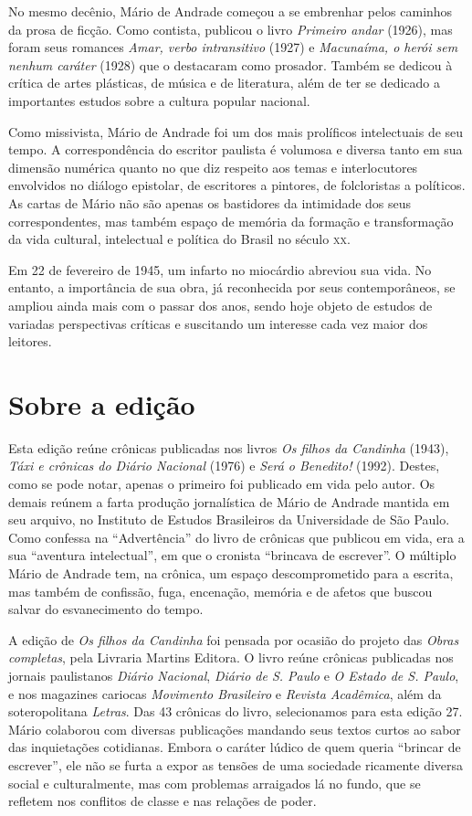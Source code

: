 No mesmo decênio, Mário de Andrade começou a se embrenhar pelos caminhos
da prosa de ficção. Como contista, publicou o livro \emph{Primeiro
andar} (1926), mas foram seus romances \emph{Amar, verbo intransitivo}
(1927) e \emph{Macunaíma, o herói sem nenhum caráter} (1928) que o
destacaram como prosador. Também se dedicou à crítica de artes
plásticas, de música e de literatura, além de ter se dedicado a
importantes estudos sobre a cultura popular nacional.

Como missivista, Mário de Andrade foi um dos mais prolíficos
intelectuais de seu tempo. A correspondência do escritor paulista é
volumosa e diversa tanto em sua dimensão numérica quanto no que diz
respeito aos temas e interlocutores envolvidos no diálogo epistolar, de
escritores a pintores, de folcloristas a políticos. As cartas de Mário
não são apenas os bastidores da intimidade dos seus correspondentes, mas
também espaço de memória da formação e transformação da vida cultural,
intelectual e política do Brasil no século \textsc{xx}.

Em 22 de fevereiro de 1945, um infarto no miocárdio abreviou sua vida.
No entanto, a importância de sua obra, já reconhecida por seus
contemporâneos, se ampliou ainda mais com o passar dos anos, sendo hoje
objeto de estudos de variadas perspectivas críticas e suscitando um
interesse cada vez maior dos leitores.

\section{Sobre a edição}

Esta edição reúne crônicas publicadas nos livros \emph{Os filhos da
Candinha} (1943), \emph{Táxi e crônicas do Diário Nacional} (1976) e
\emph{Será o Benedito!} (1992). Destes, como se pode notar, apenas o
primeiro foi publicado em vida pelo autor. Os demais reúnem a farta
produção jornalística de Mário de Andrade mantida em seu arquivo, no
Instituto de Estudos Brasileiros da Universidade de São Paulo. Como
confessa na ``Advertência'' do livro de crônicas que publicou em vida,
era a sua ``aventura intelectual'', em que o cronista ``brincava de
escrever''. O múltiplo Mário de Andrade tem, na crônica, um espaço
descomprometido para a escrita, mas também de confissão, fuga,
encenação, memória e de afetos que buscou salvar do esvanecimento do
tempo.

A edição de \emph{Os filhos da Candinha} foi pensada por ocasião do
projeto das \emph{Obras completas}, pela Livraria Martins Editora. O
livro reúne crônicas publicadas nos jornais paulistanos \emph{Diário
Nacional}, \emph{Diário de S. Paulo} e \emph{O Estado de S. Paulo}, e
nos magazines cariocas \emph{Movimento Brasileiro} e \emph{Revista
Acadêmica}, além da soteropolitana \emph{Letras}. Das 43 crônicas do
livro, selecionamos para esta edição 27. Mário colaborou com diversas
publicações mandando seus textos curtos ao sabor das inquietações
cotidianas. Embora o caráter lúdico de quem queria ``brincar de
escrever'', ele não se furta a expor as tensões de uma sociedade
ricamente diversa social e culturalmente, mas com problemas arraigados
lá no fundo, que se refletem nos conflitos de classe e nas relações de
poder.

